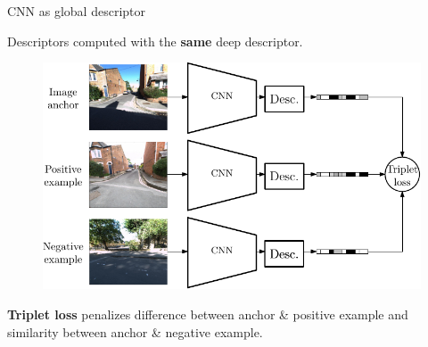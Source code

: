 \begin{frame}{CNN as global descriptor}
{\begin{figure}
	\end{figure}	
	\vfill
	Descriptors computed with the \textbf{same}	deep descriptor.
	}
	{
	\begin{figure}
	\centering
	\includegraphics[width=0.7\linewidth]{vect/method/fig2/3n}
	\end{figure}	
	\vfill
	\textbf{Triplet loss} penalizes difference between anchor \& positive example and similarity between anchor \& negative example.
	}
\end{frame}

